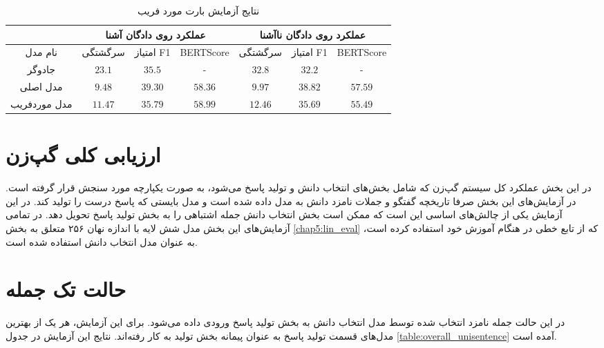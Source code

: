 \begin{table}[h]
	\caption{نتایج آزمایش بارت مورد فریب}
	\label{table:bart_deceive}
	\begin{tabular}{|c|c|c|c|c|c|c|}
		\hline
		& \multicolumn{3}{c|}{عملکرد روی دادگان آشنا} & \multicolumn{3}{c|}{عملکرد روی دادگان نا‌آشنا} \\ \hline
		نام مدل      & سرگشتگی     & امتیاز F1     & BERTScore     & سرگشتگی      & امتیاز F1      & BERTScore      \\ \hline
		جادوگر       & $23.1$      & $35.5$        & -             & $32.8$       & $32.2$         & -              \\ \hline
		مدل اصلی     & $9.48$      & $39.30$       & $58.36$       & $9.97$       & $38.82$        & $57.59$        \\ \hline
		مدل موردفریب & $11.47$     & $35.79$       & $58.99$       & $12.46$      & $35.69$        & $55.49$        \\ \hline
	\end{tabular}
\end{table}


\section{ارزیابی کلی گپ‌زن}
در این بخش عملکرد کل سیستم گپ‌زن که شامل بخش‌های انتخاب دانش و تولید پاسخ می‌شود، به صورت یکپارچه مورد سنجش قرار گرفته است. در آزمایش‌های این بخش صرفا تاریخچه گفتگو و جملات نامزد دانش به مدل داده شده است و مدل بایستی که پاسخ درست را تولید کند. در این آزمایش یکی از چالش‌های اساسی این است که ممکن است بخش انتخاب دانش جمله اشتباهی را به بخش تولید پاسخ تحویل دهد. در تمامی آزمایش‌های این بخش مدل شش لایه با اندازه نهان ۲۵۶ متعلق به بخش 
\ref{chap5:lin_eval}
که از تابع خطی در هنگام آموزش خود استفاده کرده است،‌ به عنوان مدل انتخاب دانش استفاده شده است.

\section{حالت تک جمله}
در این حالت جمله نامزد انتخاب شده توسط مدل انتخاب دانش به بخش تولید پاسخ ورودی داده می‌شود. برای این آزمایش، هر یک از بهترین مدل‌های قسمت تولید پاسخ به عنوان پیمانه بخش تولید به کار رفته‌اند. نتایج این آزمایش در جدول 
 \ref{table:overall_unisentence} 
آمده است.

